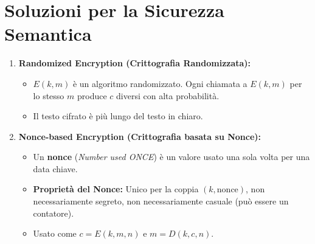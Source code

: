 \section{Soluzioni per la Sicurezza Semantica}
\begin{enumerate}
    \item \textbf{Randomized Encryption (Crittografia Randomizzata):}
    \begin{itemize}
        \item $E(k,m)$ è un algoritmo randomizzato. Ogni chiamata a $E(k,m)$ per lo stesso $m$ produce $c$ diversi con alta probabilità.
        \item Il testo cifrato è più lungo del testo in chiaro.
    \end{itemize}
    \item \textbf{Nonce-based Encryption (Crittografia basata su Nonce):}
    \begin{itemize}
        \item Un \textbf{nonce} (\textit{Number used ONCE}) è un valore usato una sola volta per una data chiave.
        \item \textbf{Proprietà del Nonce:} Unico per la coppia $(k, \text{nonce})$, non necessariamente segreto, non necessariamente casuale (può essere un contatore).
        \item Usato come $c = E(k, m, n)$ e $m = D(k, c, n)$.
    \end{itemize}
\end{enumerate}

